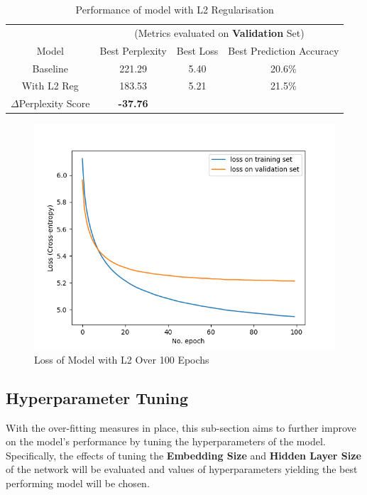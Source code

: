 \documentclass[sigconf,nonacm=true]{acmart}
\begin{document}
\begin{table}[H]
	\label{tab:regbasecomp}
	\begin{adjustbox}{width=\columnwidth}
		\begin{tabular}{cccc}
			\toprule
			&\multicolumn{3}{c}{(Metrics evaluated on \textbf{Validation} Set)}\\
			Model &Best Perplexity&Best Loss&Best Prediction Accuracy\\
			\midrule
			Baseline & 221.29 & 5.40 & 20.6\% \\
			With L2 Reg & 183.53 & 5.21 & 21.5\% \\
			\midrule
			$\Delta$Perplexity Score & \textbf{-37.76}\\
			\bottomrule
		\end{tabular}
	\end{adjustbox}
	\caption{Performance of model with L2 Regularisation}
\end{table}

\begin{figure}[H]
	\centering
	\includegraphics[scale=0.47]{figures/l2_loss.png}
	\caption{Loss of Model with L2 Over 100 Epochs}
	\label{fig:l2loss}
\end{figure}


\subsection{Hyperparameter Tuning}
With the over-fitting measures in place, this sub-section aims to further improve on the model's performance by tuning the hyperparameters of the model. Specifically, the effects of tuning the  \textbf{Embedding Size} and \textbf{Hidden Layer Size} of the network will be evaluated and values of hyperparameters yielding the best performing model will be chosen.
\end{document}
